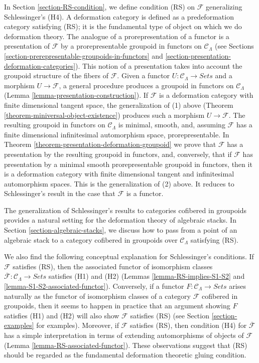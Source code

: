 \medskip \noindent
In
Section \ref{section-RS-condition},
we define condition (RS) on $\mathcal{F}$ generalizing Schlessinger's (H4).
A deformation
category is defined as a predeformation category satisfying (RS); it is the 
fundamental type of object on which we do deformation theory. The analogue of a 
prorepresentation of a functor is a presentation of $\mathcal{F}$ by a 
prorepresentable groupoid in functors on $\mathcal{C}_\Lambda$ (see 
Sections \ref{section-prerepresentable-groupoids-in-functors} and 
\ref{section-presentation-deformation-categories}).
This notion of a presentation takes into 
account the groupoid structure of the fibers of $\mathcal{F}$. Given a functor 
$U: \mathcal{C}_\Lambda \to \textit{Sets}$ and a morphism $U 
\to \mathcal{F}$, a general procedure produces a groupoid in functors on 
$\mathcal{C}_\Lambda$ (Lemma \ref{lemma-presentation-construction}).  If 
$\mathcal{F}$ is a deformation category with finite dimensional tangent space, 
the generalization of (1) above (Theorem 
\ref{theorem-miniversal-object-existence}) produces such a morphism $U 
\to \mathcal{F}$.  The resulting groupoid in functors on $\mathcal 
C_\Lambda$ is minimal, smooth, and, assuming $\mathcal{F}$ has a finite 
dimensional infinitesimal automorphism space, prorepresentable. In Theorem 
\ref{theorem-presentation-deformation-groupoid} we prove that $\mathcal{F}$ has 
a presentation by the resulting groupoid in functors, and, conversely, that if 
$\mathcal{F}$ has presentation by a minimal smooth prorepresentable groupoid in 
functors, then it is a deformation category with finite dimensional tangent and 
infinitesimal automorphism spaces. This is the generalization of (2) above. It 
reduces to Schlessinger's result in the case that $\mathcal{F}$ is a functor.

\medskip \noindent
The generalization of Schlessinger's results to categories cofibered in 
groupoids provides a natural setting for the deformation theory of algebraic 
stacks.  In Section \ref{section-algebraic-stacks}, we discuss how to pass from 
a point of an algebraic stack to a category cofibered in groupoids over 
$\mathcal{C}_\Lambda$ satisfying (RS).

\medskip \noindent
We also find the following conceptual explanation for Schlessinger's 
conditions.  If $\mathcal{F}$ satisfies (RS), then the associated functor of 
isomorphism classes $\overline{\mathcal{F}}: \mathcal{C}_\Lambda \to 
\textit{Sets}$ satisfies (H1) and (H2) (Lemmas 
\ref{lemma-RS-implies-S1-S2} and \ref{lemma-S1-S2-associated-functor}).  
Conversely, if a functor $F: \mathcal{C}_\Lambda \to 
\textit{Sets}$ arises naturally as the functor of isomorphism classes of 
a category $\mathcal{F}$ cofibered in groupoids, then it seems to happen in 
practice that an argument showing $F$ satisfies (H1) and (H2) will also show 
$\mathcal{F}$ satisfies (RS) (see Section \ref{section-examples} for
examples).  
Moreover, if $\mathcal{F}$ satisfies (RS), then condition (H4) for 
$\overline{\mathcal{F}}$ has a simple interpretation in terms of extending 
automorphisms of objects of $\mathcal{F}$ (Lemma 
\ref{lemma-RS-associated-functor}).  These observations suggest that (RS) 
should be regarded as the fundamental deformation theoretic gluing condition.




